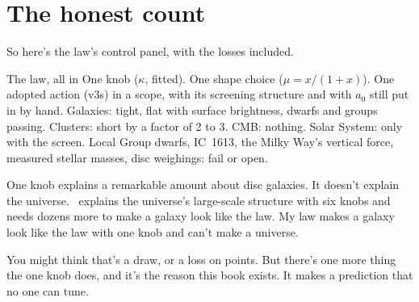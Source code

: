 \section{The honest count}

So here's the law's control panel, with the losses included.

\begin{knobbox}{The law, all in}
One knob ($\kappa$, fitted). One shape choice ($\mu=x/(1+x)$). One adopted action (v3s) in a scope, with its screening structure and with $a_0$ still put in by hand. Galaxies: tight, flat with surface brightness, dwarfs and groups passing. Clusters: short by a factor of 2 to 3. CMB: nothing. Solar System: only with the screen. Local Group dwarfs, IC~1613, the Milky Way's vertical force, measured stellar masses, disc weighings: fail or open.
\end{knobbox}

One knob explains a remarkable amount about disc galaxies. It doesn't explain the universe. \LCDM\ explains the universe's large-scale structure with six knobs and needs dozens more to make a galaxy look like the law. My law makes a galaxy look like the law with one knob and can't make a universe.

You might think that's a draw, or a loss on points. But there's one more thing the one knob does, and it's the reason this book exists. It makes a prediction that no one can tune.

